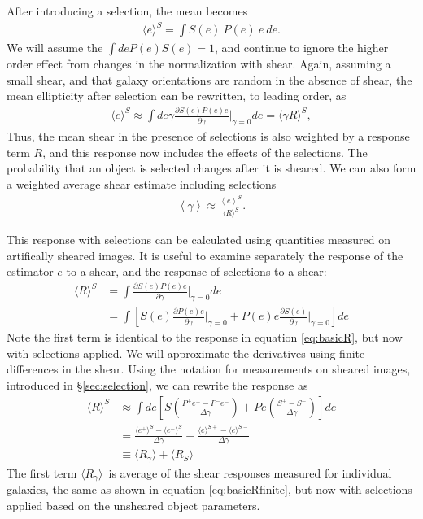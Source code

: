 \documentclass[a4paper,fleqn,usenatbib]{mnras}
\newcommand{\mest}{e}
\newcommand{\mcalR}{$R$}
\newcommand{\mcalRmean}{$\langle R \rangle$}
\newcommand{\mcalRg}{$R_{\gamma}$}
\newcommand{\mcalRS}{$R_{S}$}
\newcommand{\mcalRgmean}{$\langle R_{\gamma} \rangle$}
\begin{document}
After introducing a selection, the mean becomes
\begin{align}
    \langle \mest \rangle^S = \int S(\mest)~P(\mest)~\mest~d\mest.
\end{align}
We will assume the $\int de P(\mest) S(\mest) = 1$, and continue to ignore
the higher order effect from changes in the normalization with shear.
Again, assuming a small shear, and that galaxy orientations are random in the
absence of shear, the mean ellipticity after selection can be rewritten, to
leading order, as
\begin{align}
    \langle e \rangle^S \approx \int de \gamma \frac{\partial S(\mest) P(\mest) \mest  }{\partial \gamma}\bigg|_{\gamma=0} d\mest = \langle \gamma R \rangle^S,
\end{align}
Thus, the mean shear in the presence of selections is also weighted by a
response term \mcalR, and this response now includes the effects of the selections.
The probability that an object is selected changes after it is sheared.  We can
also form a weighted average shear estimate including selections
\begin{align}
    \left< \gamma \right> \approx \frac{\left< e \right>^S}{\mbox{\mcalRmean}^S}.
\end{align}

This response with selections can be calculated using quantities measured on
artifically sheared images. It is useful to examine separately the response of
the estimator $\mest$ to a shear, and the response of selections to a shear:
\begin{align}
    \mbox{\mcalRmean}^S  &= \int \frac{\partial S(\mest) P(\mest) \mest  }{\partial \gamma}\bigg|_{\gamma=0} d\mest \nonumber \\
    &= \int \left[ S(\mest) \frac{\partial P(\mest) \mest}{\partial \gamma}\bigg|_{\gamma=0} +  P(\mest) \mest  \frac{\partial S(\mest)}{\partial \gamma}\bigg|_{\gamma=0} \right] d\mest
\end{align}
Note the first term is identical to the response in equation \ref{eq:basicR},
but now with selections applied.
We will approximate the derivatives using finite differences in the shear.
Using the notation for measurements on sheared images, introduced
in \S \ref{sec:selection}, we can rewrite the response as
\begin{align} \label{eq:Rmean}
    \mbox{\mcalRmean}^S &\approx
    \int d\mest \left [ S \left( \frac{ P^+ \mest^+ - P^- \mest^- }{\Delta \gamma}\right) + P \mest \left( \frac{ S^+ - S^- }{\Delta \gamma}\right) \right] d\mest \nonumber \\
    &=\frac{\langle \mest^+ \rangle^S - \langle \mest^- \rangle^S}{\Delta \gamma} + 
\frac{\langle \mest \rangle^{S+} - \langle \mest \rangle^{S-}}{\Delta \gamma} \nonumber \\
       &\equiv \langle \mbox{\mcalRg} \rangle + \langle \mbox{\mcalRS} \rangle
\end{align}
The first term \mcalRgmean\ is average of the shear responses measured for
individual galaxies, the same as shown in equation \ref{eq:basicRfinite}, but
now with selections applied based on the unsheared object parameters.
\end{document}
